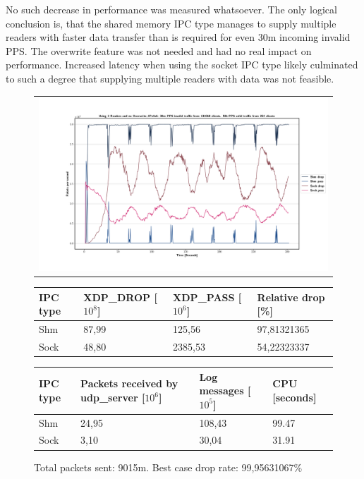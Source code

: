 No such decrease in performance was measured whatsoever.
The only logical conclusion is, that the shared memory IPC type manages to supply multiple readers with faster data transfer than is required for even 30m incoming invalid PPS.
The overwrite feature was not needed and had no real impact on performance.
Increased latency when using the socket IPC type likely culminated to such a degree that supplying multiple readers with data was not feasible.

\begin{figure}[!h]
	\centering
	\scriptsize
	\begin{tabular}{c}
    	\centerline{\includegraphics[width=1.2\textwidth]{images/IPv4v6_30m_2ndReaderNoOverwrite_1.png}}
	\end{tabular}
	\begin{tabular}{llll}
		\toprule
		\textbf{IPC type} & \textbf{XDP\_DROP [$10^8$]} & \textbf{XDP\_PASS [$10^6$]} & \textbf{Relative drop [\%]} \\ \midrule 
		Shm & 87,99 & 125,56 & 97,81321365 \\
        Sock & 48,80 & 2385,53 & 54,22323337 \\
	\bottomrule
	\end{tabular}
    \begin{tabular}{llll}
		\toprule
		\textbf{IPC type} & \textbf{Packets received by udp\_server [$10^6$]} & \textbf{Log messages [$10^5$]} & \textbf{CPU [seconds]} \\ \midrule 
		Shm & 24,95 & 108,43 & 99.47 \\
        Sock & 3,10 & 30,04 & 31.91 \\
	\bottomrule
	\end{tabular}
	\caption[Simplefail2ban with 2nd Reader, IPv4v6, 30m \ac{PPS}, 131068 malicious clients]{Total packets sent: 9015m. Best case drop rate: 99,95631067\%}
	\label{fig:data:ipv4v6:30m:131068:2nd:NoOverwrite}
\end{figure}